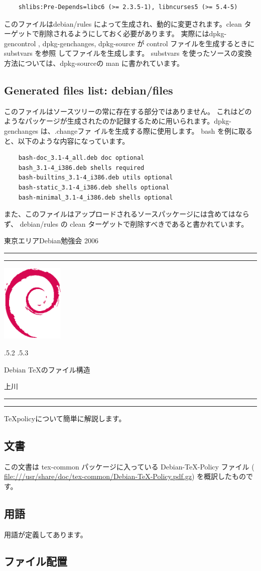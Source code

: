 \documentclass[mingoth,a4paper]{jsarticle}
\makeatletter
\renewcommand{\section}{\@startsection{section}{1}{\z@}%
    {\Cvs \@plus.5\Cdp \@minus.2\Cdp}%
    {.5\Cvs \@plus.3\Cdp}%
    {\normalfont\Large\headfont\raggedright\centering}} %
\newcommand{\dancersection}[2]{%
\newpage
東京エリアDebian勉強会 2006
\hrule
\vspace{0.5mm}
\hrule
\hfill{}\includegraphics[width=3cm]{image200502/openlogo-nd.eps}\\
\vspace{-4cm}
\begin{center}
  \section{#1}
\end{center}
\hfill{}#2\hspace{3cm}\space\\
\hrule
\hrule
\vspace{1cm}
}
\makeatother
\begin{document}
\begin{verbatim}
	shlibs:Pre-Depends=libc6 (>= 2.3.5-1), libncurses5 (>= 5.4-5)
\end{verbatim}
	
	このファイルはdebian/rules によって生成され、動的に変更されます。clean ターゲットで削除されるようにしておく必要があります。
	実際にはdpkg-gencontrol , dpkg-genchanges, dpkg-source が control ファイルを生成するときに substvars を参照
	してファイルを生成します。
	substvars を使ったソースの変換方法については、dpkg-sourceの man に書かれています。
	
\subsection{Generated files list: debian/files}
	このファイルはソースツリーの常に存在する部分ではありません。
	これはどのようなパッケージが生成されたのか記録するために用いられます。dpkg-genchanges は、.changeファ
	イルを生成する際に使用します。
	bash を例に取ると、以下のような内容になっています。

\begin{verbatim}
	bash-doc_3.1-4_all.deb doc optional
	bash_3.1-4_i386.deb shells required
	bash-builtins_3.1-4_i386.deb utils optional
	bash-static_3.1-4_i386.deb shells optional
	bash-minimal_3.1-4_i386.deb shells optional
\end{verbatim}

	また、このファイルはアップロードされるソースパッケージには含めてはならず、
	debian/rules の clean ターゲットで削除すべきであると書かれています。

\dancersection{Debian \TeX{}のファイル構造}{上川}
\label{sec:latexdebian1}

\TeX policyについて簡単に解説します。

\subsection{文書}
この文書は tex-common パッケージに入っている Debian-\TeX-Policy ファイル ( \url{file:///usr/share/doc/tex-common/Debian-TeX-Policy.pdf.gz})
を概訳したものです。

\subsection{用語}

用語が定義してあります。

\subsection{ファイル配置}
\end{document}
